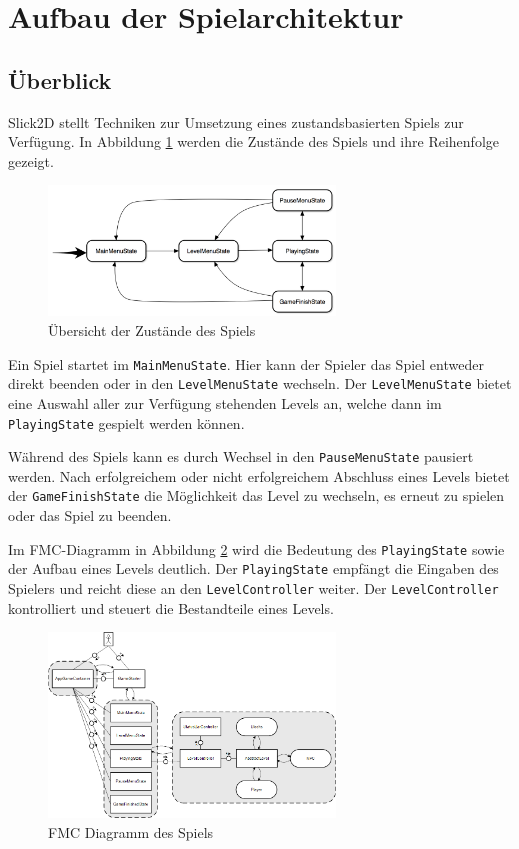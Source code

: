 \section{Aufbau der Spielarchitektur}
\label{sec:architektur}

\subsection{Überblick}
\label{sub:architektur:ueberblick}

Slick2D stellt Techniken zur Umsetzung eines zustandsbasierten Spiels zur Verfügung.
In Abbildung \ref{fig:spielarchitektur:states} werden die Zustände des Spiels und ihre Reihenfolge gezeigt.

\begin{figure}[H]
\centering
\includegraphics[width=3in]{img/05_states.png}
\caption{Übersicht der Zustände des Spiels}
\label{fig:spielarchitektur:states}
\end{figure}


Ein Spiel startet im \texttt{MainMenuState}.
Hier kann der Spieler das Spiel entweder direkt beenden oder in den \texttt{LevelMenuState} wechseln.
Der \texttt{LevelMenuState} bietet eine Auswahl aller zur Verfügung stehenden Levels an, welche dann im \texttt{PlayingState} gespielt werden können.

Während des Spiels kann es durch Wechsel in den \texttt{PauseMenuState} pausiert werden.
Nach erfolgreichem oder nicht erfolgreichem Abschluss eines Levels bietet der \texttt{GameFinishState} die Möglichkeit das Level zu wechseln, es erneut zu spielen oder das Spiel zu beenden.


Im FMC-Diagramm in Abbildung \ref{fig:spielarchitektur:fmc} wird die Bedeutung des \texttt{PlayingState} sowie der Aufbau eines Levels deutlich.
Der \texttt{PlayingState} empfängt die Eingaben des Spielers und reicht diese an den \texttt{LevelController} weiter.
Der \texttt{LevelController} kontrolliert und steuert die Bestandteile eines Levels.

\begin{figure}[H]
\centering
\includegraphics[width=3in]{img/05_fmc.png}
\caption{FMC Diagramm des Spiels}
\label{fig:spielarchitektur:fmc}
\end{figure}

